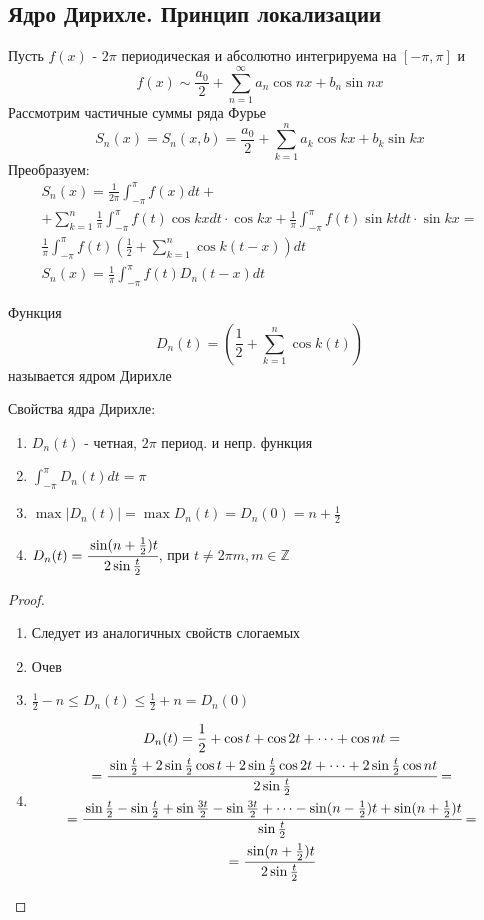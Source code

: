 \documentclass{article}
\begin{document}
\subsection{Ядро Дирихле. Принцип локализации}
Пусть $f(x)$ - $2\pi$ периодическая и абсолютно интегрируема на $[-\pi,\pi]$ и
\[
  f(x) \sim \frac{a_0}{2}+\sum_{n=1}^{\infty}a_n \cos nx + b_n \sin nx
\]
Рассмотрим частичные суммы ряда Фурье
\[
  S_n(x)=S_n(x,b)=\frac{a_0}{2}+\sum_{k=1}^{n}a_k \cos kx + b_k \sin kx
\]
Преобразуем:
\begin{gather*}
  S_n(x)= \frac{1}{2\pi}\int_{-\pi}^{\pi}f(x)dt+ \\ 
  +\sum_{k=1}^{n}\frac{1}{\pi}\int_{-\pi}^{\pi}f(t)\cos kx dt \cdot \cos kx +
  \frac{1}{\pi}\int_{-\pi}^{\pi}f(t)\sin kt dt \cdot \sin kx =\\
  \frac{1}{\pi}\int_{-\pi}^{\pi}f(t)
  \left(\frac{1}{2}+\sum_{k=1}^{n}\cos k(t-x)\right)dt \\ 
  S_n(x)=\frac{1}{\pi}\int_{-\pi}^{\pi}f(t)D_n(t-x)dt
\end{gather*}
\begin{definition}
  Функция 
  \[
    D_n(t)=\left(\frac{1}{2}+\sum_{k=1}^{n}\cos k(t)\right)
  \]
  называется ядром Дирихле
\end{definition}
Свойства ядра Дирихле:
\begin{enumerate}
  \item $D_n(t)$ - четная, $2\pi$ период. и непр. функция
  \item $\int_{-\pi}^{\pi}D_n(t)dt=\pi$
  \item $\max|D_n(t)|=\max D_n(t)=D_n(0)=n+\frac{1}{2}$
  \item $D_n(t)=\cfrac{\sin (n+\frac{1}{2})t}{2\sin \frac{t}{2}}$, при $t\neq 2\pi m, m\in \mathbb{Z}$
\end{enumerate}
\begin{proof} \phantom{.} 

  \begin{enumerate}
    \item Следует из аналогичных свойств слогаемых
    \item Очев
    \item $\frac{1}{2}-n\le D_n(t) \le \frac{1}{2}+n = D_n(0)$
    \item
      \begin{gather*}
        D_n(t)=\frac{1}{2}+\cos t + \cos 2t + \dots + \cos nt = \\ 
        = \cfrac{\sin \frac{t}{2}+2\sin\frac{t}{2}\cos t + 2\sin\frac{t}{2}\cos 2t + \dots + 2\sin \frac{t}{2}\cos nt}{2\sin\frac{t}{2}}= \\
        =\cfrac{\sin \frac{t}{2}-\sin \frac{t}{2}+\sin \frac{3t}{2} - \sin \frac{3t}{2} + \dots - \sin (n-\frac{1}{2})t + \sin (n+\frac{1}{2})t}{\sin\frac{t}{2}}= \\ 
        =\cfrac{\sin (n+\frac{1}{2})t}{2\sin\frac{t}{2}} 
      \end{gather*}
  \end{enumerate}
\end{proof}
\end{document}

